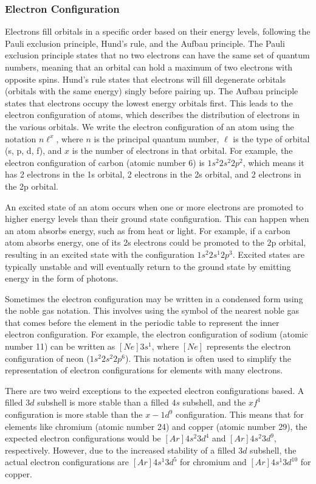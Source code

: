 \subsubsection{Electron Configuration}
Electrons fill orbitals in a specific order based on their energy levels, following the Pauli exclusion principle, Hund's rule, and the Aufbau principle. The Pauli exclusion principle states that no two electrons can have the same set of quantum numbers, meaning that an orbital can hold a maximum of two electrons with opposite spins. Hund's rule states that electrons will fill degenerate orbitals (orbitals with the same energy) singly before pairing up. The Aufbau principle states that electrons occupy the lowest energy orbitals first. This leads to the electron configuration of atoms, which describes the distribution of electrons in the various orbitals. We write the electron configuration of an atom using the notation $n\ell^x$, where $n$ is the principal quantum number, $\ell$ is the type of orbital (s, p, d, f), and $x$ is the number of electrons in that orbital. For example, the electron configuration of carbon (atomic number 6) is $1s^2 2s^2 2p^2$, which means it has 2 electrons in the 1s orbital, 2 electrons in the 2s orbital, and 2 electrons in the 2p orbital.

An excited state of an atom occurs when one or more electrons are promoted to higher energy levels than their ground state configuration. This can happen when an atom absorbs energy, such as from heat or light. For example, if a carbon atom absorbs energy, one of its 2s electrons could be promoted to the 2p orbital, resulting in an excited state with the configuration $1s^2 2s^1 2p^3$. Excited states are typically unstable and will eventually return to the ground state by emitting energy in the form of photons.

Sometimes the electron configuration may be written in a condensed form using the noble gas notation. This involves using the symbol of the nearest noble gas that comes before the element in the periodic table to represent the inner electron configuration. For example, the electron configuration of sodium (atomic number 11) can be written as $[Ne] 3s^1$, where $[Ne]$ represents the electron configuration of neon ($1s^2 2s^2 2p^6$). This notation is often used to simplify the representation of electron configurations for elements with many electrons.

There are two weird exceptions to the expected electron configurations based. A filled $3d$ subshell is more stable than a filled $4s$ subshell, and the $xf^1$ configuration is more stable than the $x-1d^9$ configuration. This means that for elements like chromium (atomic number 24) and copper (atomic number 29), the expected electron configurations would be $[Ar] 4s^2 3d^4$ and $[Ar] 4s^2 3d^9$, respectively. However, due to the increased stability of a filled $3d$ subshell, the actual electron configurations are $[Ar] 4s^1 3d^5$ for chromium and $[Ar] 4s^1 3d^{10}$ for copper.

